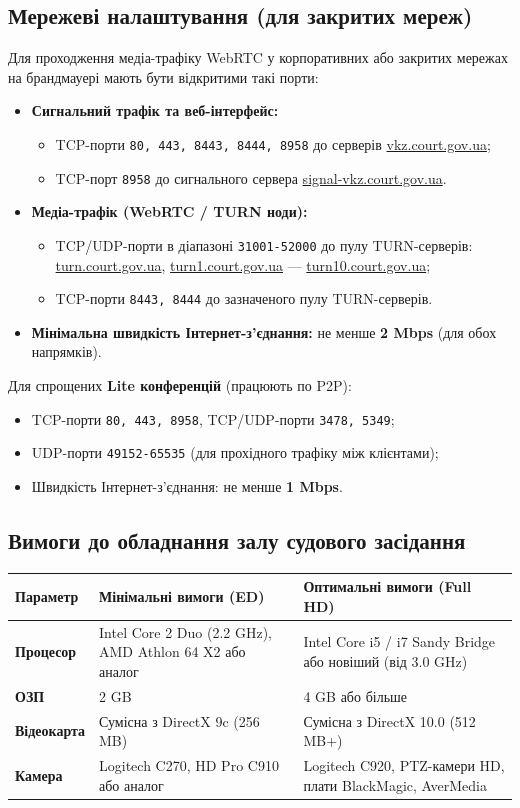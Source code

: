 \documentclass{article}
\begin{document}
\subsection{Мережеві налаштування (для закритих мереж)}
Для проходження медіа-трафіку WebRTC у корпоративних або закритих мережах на брандмауері мають бути відкритими такі порти:
\begin{itemize}
    \item \textbf{Сигнальний трафік та веб-інтерфейс:}
    \begin{itemize}
        \item TCP-порти \texttt{80, 443, 8443, 8444, 8958} до серверів \url{vkz.court.gov.ua};
        \item TCP-порт \texttt{8958} до сигнального сервера \url{signal-vkz.court.gov.ua}.
    \end{itemize}
    \item \textbf{Медіа-трафік (WebRTC / TURN ноди):}
    \begin{itemize}
        \item TCP/UDP-порти в діапазоні \texttt{31001-52000} до пулу TURN-серверів: \url{turn.court.gov.ua}, \url{turn1.court.gov.ua} --- \url{turn10.court.gov.ua};
        \item TCP-порти \texttt{8443, 8444} до зазначеного пулу TURN-серверів.
    \end{itemize}
    \item \textbf{Мінімальна швидкість Інтернет-з'єднання:} не менше \textbf{2 Mbps} (для обох напрямків).
\end{itemize}

Для спрощених \textbf{Lite конференцій} (працюють по P2P):
\begin{itemize}
    \item TCP-порти \texttt{80, 443, 8958}, TCP/UDP-порти \texttt{3478, 5349};
    \item UDP-порти \texttt{49152-65535} (для прохідного трафіку між клієнтами);
    \item Швидкість Інтернет-з'єднання: не менше \textbf{1 Mbps}.
\end{itemize}

\subsection{Вимоги до обладнання залу судового засідання}
\begin{longtable}{@{}p{3.5cm}p{5.0cm}p{5.5cm}@{}}
\toprule
\textbf{Параметр} & \textbf{Мінімальні вимоги (ED)} & \textbf{Оптимальні вимоги (Full HD)} \\
\midrule
\textbf{Процесор} & Intel Core 2 Duo (2.2 GHz), AMD Athlon 64 X2 або аналог & Intel Core i5 / i7 Sandy Bridge або новіший (від 3.0 GHz) \\
\textbf{ОЗП} & 2 GB & 4 GB або більше \\
\textbf{Відеокарта} & Сумісна з DirectX 9c (256 MB) & Сумісна з DirectX 10.0 (512 MB+) \\
\textbf{Камера} & Logitech C270, HD Pro C910 або аналог & Logitech C920, PTZ-камери HD, плати BlackMagic, AverMedia \\
\bottomrule
\end{longtable}
\end{document}
